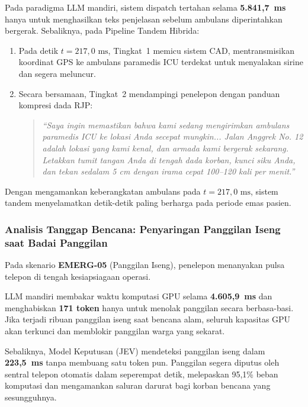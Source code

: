 \documentclass[journal,compsoc]{IEEEtran}
\begin{document}
Pada paradigma LLM mandiri, sistem dispatch tertahan selama \textbf{5.841,7~ms} hanya untuk menghasilkan teks penjelasan sebelum ambulans diperintahkan bergerak. Sebaliknya, pada Pipeline Tandem Hibrida:
\begin{enumerate}
    \item Pada detik \textbf{$t = 217{,}0 \text{ ms}$}, Tingkat~1 memicu sistem CAD, mentransmisikan koordinat GPS ke ambulans paramedis ICU terdekat untuk menyalakan sirine dan segera meluncur.
    \item Secara bersamaan, Tingkat~2 mendampingi penelepon dengan panduan kompresi dada RJP:
    \begin{quote}
    \textit{``Saya ingin memastikan bahwa kami sedang mengirimkan ambulans paramedis ICU ke lokasi Anda secepat mungkin... Jalan Anggrek No. 12 adalah lokasi yang kami kenal, dan armada kami bergerak sekarang. Letakkan tumit tangan Anda di tengah dada korban, kunci siku Anda, dan tekan sedalam 5 cm dengan irama cepat 100--120 kali per menit.''}
    \end{quote}
\end{enumerate}
Dengan mengamankan keberangkatan ambulans pada $t = 217{,}0 \text{ ms}$, sistem tandem menyelamatkan detik-detik paling berharga pada periode emas pasien.

\subsubsection{Analisis Tanggap Bencana: Penyaringan Panggilan Iseng saat Badai Panggilan}
Pada skenario \textbf{EMERG-05} (Panggilan Iseng), penelepon menanyakan pulsa telepon di tengah kesiapsiagaan operasi.

LLM mandiri membakar waktu komputasi GPU selama \textbf{4.605,9~ms} dan menghabiskan \textbf{171 token} hanya untuk menolak panggilan secara berbasa-basi. Jika terjadi ribuan panggilan iseng saat bencana alam, seluruh kapasitas GPU akan terkunci dan memblokir panggilan warga yang sekarat.

Sebaliknya, Model Keputusan (JEV) mendeteksi panggilan iseng dalam \textbf{223,5~ms} tanpa membuang satu token pun. Panggilan segera diputus oleh sentral telepon otomatis dalam seperempat detik, melepaskan 95,1\% beban komputasi dan mengamankan saluran darurat bagi korban bencana yang sesungguhnya.
\end{document}
